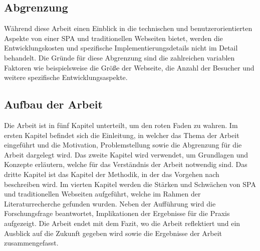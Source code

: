 \subsection{Abgrenzung}
Während diese Arbeit einen Einblick in die technischen und benutzerorientierten Aspekte von einer \ac{SPA} und traditionellen Webseiten bietet, werden die Entwicklungskosten und spezifische Implementierungsdetails nicht im Detail behandelt.
Die Gründe für diese Abgrenzung sind die zahlreichen variablen Faktoren wie beispielsweise die Größe der Webseite, die Anzahl der Besucher und weitere spezifische Entwicklungsaspekte.
\subsection{Aufbau der Arbeit}

Die Arbeit ist in fünf Kapitel unterteilt, um den roten Faden zu wahren.
Im ersten Kapitel befindet sich die Einleitung, in welcher das Thema der Arbeit eingeführt und die Motivation, Problemstellung sowie die Abgrenzung für die Arbeit dargelegt wird.
Das zweite Kapitel wird verwendet, um Grundlagen und Konzepte erläutern, welche für das Verständnis der Arbeit notwendig sind.
Das dritte Kapitel ist das Kapitel der Methodik, in der das Vorgehen nach  beschreiben wird.
Im vierten Kapitel werden die Stärken und Schwächen von \ac{SPA} und traditionellen Webseiten aufgeführt, welche im Rahmen der Literaturrecherche gefunden wurden.
Neben der Aufführung wird die Forschungsfrage beantwortet, Implikationen der Ergebnisse für die Praxis aufgezeigt.
Die Arbeit endet mit dem Fazit, wo die Arbeit reflektiert und ein Ausblick auf die Zukunft gegeben wird sowie die Ergebnisse der Arbeit zusammengefasst.
